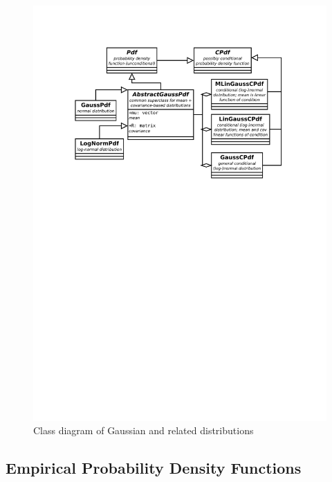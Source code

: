 \begin{figure}[h]
	\centering
	\includegraphics[width=\textwidth,keepaspectratio=true,clip=true,trim=3cm 173mm 3cm 3cm]{./diagrams/gaussian_pdfs.pdf}
	\vspace{-8mm}
	\caption{Class diagram of Gaussian and related distributions}
	\label{fig:DiaGaussPdfs}
\end{figure}

\subsection{Empirical Probability Density Functions}

